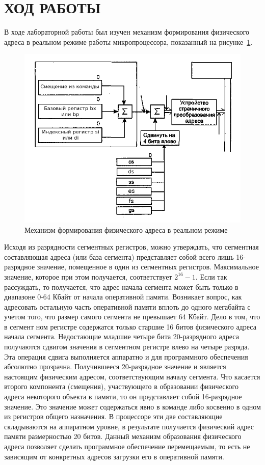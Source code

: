 \section{ХОД РАБОТЫ}

В ходе лабораторной работы был изучен механизм формирования физического адреса в 
реальном режиме работы микропроцессора, показанный на рисунке~\ref{fig:physical_address}.

\begin{figure}[htbp]
  \centering
  \includegraphics[width=150mm]{pic/physical_address}
  \caption{Механизм формирования физического адреса в реальном режиме}\label{fig:physical_address}
\end{figure}

Исходя из разрядности сегментных регистров, можно утверждать,
что сегментная составляющая адреса (или база сегмента) представляет собой всего
лишь 16-разрядное значение, помещенное в один из сегментных регистров.
Максимальное значение, которое при этом получается, соответствует $ 2^{16} - 1 $.
Если так рассуждать, то получается, что адрес начала сегмента может быть
только в диапазоне 0-64 Кбайт от начала оперативной памяти. Возникает вопрос,
как адресовать остальную часть оперативной памяти вплоть до одного мегабайта с учетом
того, что размер самого сегмента не превышает 64 Кбайт. Дело в том, что в сегмент
ном регистре содержатся только старшие 16 битов физического адреса начала сегмента.
Недостающие младшие четыре бита 20-разрядного адреса получаются сдвигом значения в
сегментном регистре влево на четыре разряда. Эта операция сдвига
выполняется аппаратно и для программного обеспечения абсолютно прозрачна.
Получившееся 20-разрядное значение и является настоящим физическим адресом,
соответствующим началу сегмента. Что касается второго компонента (смещения),
участвующего в образовании физического адреса некоторого объекта в памяти,
то он представляет собой 16-разрядное значение. Это значение может
содержаться явно в команде либо косвенно в одном из регистров общего назначения.
В процессоре эти две составляющие складываются на аппаратном уровне,
в результате получается физический адрес памяти размерностью 20 битов.
Данный механизм образования физического адреса позволяет сделать программное
обеспечение перемещаемым, то есть не зависящим от конкретных адресов
загрузки его в оперативной памяти.

